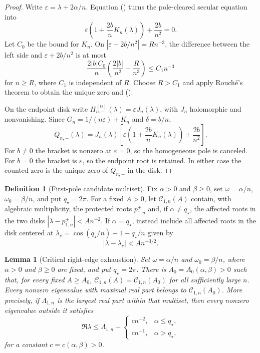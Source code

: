\documentclass[twoside,10pt]{article}
\numberwithin{equation}{section}
\theoremstyle{slbody}
\newtheorem{lemma}[theorem]{Lemma}
\theoremstyle{definition}
\newtheorem{definition}[theorem]{Definition}
\theoremstyle{remark}
\renewcommand{\eqref}[1]{%
  \textup{{\normalfont(\oldstylenums{\ref{#1}}}\normalfont)}}
\begin{document}
\begin{proof}
Write $\varepsilon=\lambda+2\alpha/n$.  Equation
\eqref{eq:critical-endpoint-green} turns the pole-cleared secular
equation into
\begin{equation}\label{eq:critical-endpoint-root-equation}
 \varepsilon\left(1+\frac{2b}{n}K_n(\lambda)\right)
       +\frac{2b}{n^2}=0.
\end{equation}
Let $C_0$ be the bound for $K_n$.  On
$|\varepsilon+2b/n^2|=Rn^{-3}$, the difference between the left side
and $\varepsilon+2b/n^2$ is at most
\[
 \frac{2|b|C_0}{n}\left(\frac{2|b|}{n^2}+\frac{R}{n^3}\right)
 \le C_1n^{-3}
\]
for $n\ge R$, where $C_1$ is independent of $R$.  Choose $R>C_1$ and
apply Rouch\'e's theorem to obtain the unique zero and
\eqref{eq:critical-endpoint-root}.

On the endpoint disk write
$H_{n,-}^{(0)}(\lambda)=\varepsilon J_n(\lambda)$, with $J_n$
holomorphic and nonvanishing.  Since
$G_n=1/(n\varepsilon)+K_n$ and $\delta=b/n$,
\[
 Q_{n,-}(\lambda)=J_n(\lambda)
 \left[\varepsilon\left(1+\frac{2b}{n}K_n(\lambda)\right)
       +\frac{2b}{n^2}\right].
\]
For $b\ne0$ the bracket is nonzero at $\varepsilon=0$, so the
homogeneous pole is canceled.  For $b=0$ the bracket is
$\varepsilon$, so the endpoint root is retained.  In either case the
counted zero is the unique zero of $Q_{n,-}$ in the disk.
\end{proof}

\begin{definition}[First-pole candidate multiset]
\label{def:critical-first-candidates}
Fix $\alpha>0$ and $\beta\ge0$, set $\omega=\alpha/n$,
$\omega_0=\beta/n$, and put $q_\star=2\pi$.  For a fixed $A>0$, let
$\mathcal C_{1,n}(A)$ contain, with algebraic multiplicity, the protected
roots $p_{1,n}^\pm$ and, if $\alpha\ne q_\star$, the affected roots in the two
disks $|\lambda-p_{1,n}^\pm|<A n^{-2}$.  If $\alpha=q_\star$, instead include
all affected roots in the disk centered at
$\lambda_c=\cos(q_\star/n)-1-q_\star/n$ given by
\[
 |\lambda-\lambda_c|<A n^{-3/2}.
\]
\end{definition}

\begin{lemma}[Critical right-edge exhaustion]
\label{lem:critical-exhaustion}
Set $\omega=\alpha/n$ and $\omega_0=\beta/n$, where
$\alpha>0$ and $\beta\ge0$ are fixed, and put $q_\star=2\pi$.  There is
$A_0=A_0(\alpha,\beta)>0$ such that, for every fixed $A\ge A_0$,
$\mathcal C_{1,n}(A)=\mathcal C_{1,n}(A_0)$ for all sufficiently large
$n$.  Every nonzero eigenvalue with maximal real part belongs to
$\mathcal C_{1,n}(A_0)$.  More precisely, if
$\Lambda_{1,n}$ is the largest real part within that multiset, then every
nonzero eigenvalue outside it
satisfies
\begin{equation}\label{eq:critical-exhaustion-separation}
 \Re\lambda\le\Lambda_{1,n}-
 \begin{cases}
  c n^{-2},&\alpha\le q_\star,\\
  c n^{-1},&\alpha>q_\star,
 \end{cases}
\end{equation}
for a constant $c=c(\alpha,\beta)>0$.
\end{lemma}
\end{document}

